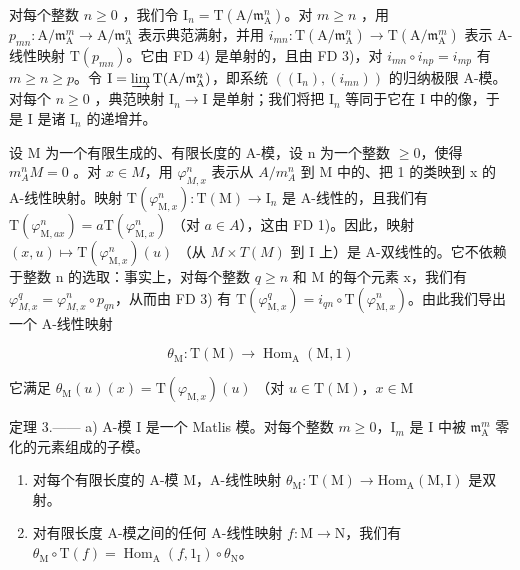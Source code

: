 对每个整数 \(n \geqslant 0\) ，我们令 \(\mathrm{I}_{n} = \mathrm{T}(\mathrm{A}/\mathfrak{m}_{\mathrm{A}}^{n})\)。对 \(m \geqslant n\) ，用 \(p_{mn}: \mathrm{A}/\mathfrak{m}_{\mathrm{A}}^{m} \longrightarrow \mathrm{A}/\mathfrak{m}_{\mathrm{A}}^{n}\) 表示典范满射，并用 \(i_{mn}: \mathrm{T}(\mathrm{A}/\mathfrak{m}_{\mathrm{A}}^{n}) \longrightarrow \mathrm{T}(\mathrm{A}/\mathfrak{m}_{\mathrm{A}}^{m})\) 表示 A-线性映射 \(\mathrm{T}(p_{mn})\)。它由 FD 4) 是单射的，且由 FD 3)，对 \(i_{mn} \circ i_{np} = i_{mp}\) 有 \(m \geqslant n \geqslant p\)。令 \(\mathrm{I} = \varinjlim \mathrm{T}(\mathrm{A}/\mathfrak{m}_{\mathrm{A}}^{n})\)，即系统 \(((\mathrm{I}_{n}), (i_{mn}))\) 的归纳极限 A-模。对每个 \(n \geqslant 0\) ，典范映射 \(\mathrm{I}_{n} \to \mathrm{I}\) 是单射；我们将把 \(\mathrm{I}_{n}\) 等同于它在 I 中的像，于是 I 是诸 \(\mathrm{I}_{n}\) 的递增并。

设 M 为一个有限生成的、有限长度的 A-模，设 n 为一个整数 \(\geqslant0\)，使得 \(m_{A}^{n}M=0\) 。对 \(x\in M\)，用 \(\varphi_{M,x}^{n}\) 表示从 \(A/m_{A}^{n}\) 到 M 中的、把 1 的类映到 x 的 A-线性映射。映射 \(\mathrm{T}(\varphi_{\mathrm{M},x}^{n}):\mathrm{T}(\mathrm{M})\to\mathrm{I}_{n}\) 是 A-线性的，且我们有 \(\mathrm{T}(\varphi_{\mathrm{M},ax}^{n})=a\mathrm{T}(\varphi_{\mathrm{M},x}^{n})\) （对 \(a\in A\)），这由 FD 1)。因此，映射 \((x,u)\mapsto\mathrm{T}(\varphi_{\mathrm{M},x}^{n})(u)\) （从 \(M\times T(M)\) 到 I 上）是 A-双线性的。它不依赖于整数 n 的选取：事实上，对每个整数 \(q\geqslant n\) 和 M 的每个元素 x，我们有 \(\varphi_{M,x}^{q}=\varphi_{M,x}^{n}\circ p_{qn}\)，从而由 FD 3) 有 \(\mathrm{T}(\varphi_{\mathrm{M},x}^{q})=i_{qn}\circ\mathrm{T}(\varphi_{\mathrm{M},x}^{n})\)。由此我们导出一个 A-线性映射

\[
\theta_ {\mathrm{M}}: \mathrm{T} (\mathrm{M}) \longrightarrow \operatorname{Hom} _ {\mathrm{A}} (\mathrm{M}, 1)
\]

它满足 \(\theta_{\mathrm{M}}(u)(x) = \mathrm{T}(\varphi_{\mathrm{M},x})(u)\) （对 \(u\in \mathrm{T}(\mathrm{M})\)，\(x\in \mathrm{M}\)

定理 3.—— a) A-模 I 是一个 Matlis 模。对每个整数 \(m \geqslant 0\)，\(\mathrm{I}_{m}\) 是 I 中被 \(\mathfrak{m}_{\mathrm{A}}^{m}\) 零化的元素组成的子模。

\begin{enumerate}
\def\labelenumi{\alph{enumi})}
\setcounter{enumi}{1}
\item
  对每个有限长度的 A-模 M，A-线性映射 \(\theta_{\mathrm{M}}: \mathrm{T}(\mathrm{M}) \longrightarrow \mathrm{Hom}_{\mathrm{A}}(\mathrm{M}, \mathrm{I})\) 是双射。
\item
  对有限长度 A-模之间的任何 A-线性映射 \(f: \mathrm{M} \to \mathrm{N}\)，我们有 \(\theta_{\mathrm{M}} \circ \mathrm{T}(f) = \operatorname{Hom}_{\mathrm{A}}(f, 1_{\mathrm{I}}) \circ \theta_{\mathrm{N}}\)。
\end{enumerate}

